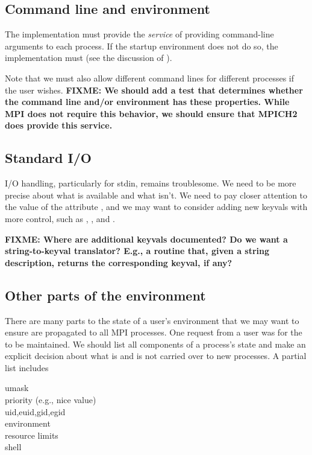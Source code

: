 \documentclass{article}
\def\fixme#1{\marginpar{FIXME:}\textbf{FIXME: #1}}
\begin{document}
\subsection{Command line and environment}
The implementation must provide the \emph{service} of providing
command-line arguments to each process.  If the startup environment
does not do so, the implementation must (see the discussion of
).  

Note that we must also allow different command lines for different processes
if the user wishes.
\fixme{We should add a test that determines whether the command line
  and/or environment has these properties.  While MPI does not require
  this behavior, we should ensure that MPICH2 does provide this service.}

\subsection{Standard I/O}
I/O handling, particularly for stdin, remains troublesome.  We need to
be more precise about what is available and what isn't.  We need to
pay closer attention to the value of the attribute ,
and we may want to consider adding new keyvals with more control, such
as , , and
. 

\fixme{Where are additional keyvals documented?  Do we want a
string-to-keyval translator?  E.g., a routine that, given a string
description, returns the corresponding keyval, if any?}

\subsection{Other parts of the environment}
There are many parts to the state of a user's environment that we may want to 
ensure are propagated to all MPI processes.  One request from a user was for
the  to be maintained.  We should list all components
of a process's state and make an explicit decision about what is and is not
carried over to new processes.  A partial list includes
\begin{description}
\item[umask]
\item[priority (e.g., nice value)]
\item[uid,euid,gid,egid]
\item[environment]
\item[resource limits]
\item[shell]
\end{description}
\end{document}
